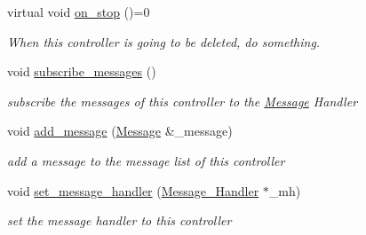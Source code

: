 \begin{DoxyCompactItemize}
virtual void \mbox{\hyperlink{classbanita_1_1_controller_a988fb70a657c61afb82f4f4cf25e7c66}{on\+\_\+stop}} ()=0
\begin{DoxyCompactList}\small\item\em When this controller is going to be deleted, do something. \end{DoxyCompactList}\item 
void \mbox{\hyperlink{classbanita_1_1_controller_a553973436941dd97e75511583a4fff26}{subscribe\+\_\+messages}} ()
\begin{DoxyCompactList}\small\item\em subscribe the messages of this controller to the \mbox{\hyperlink{classbanita_1_1_message}{Message}} Handler \end{DoxyCompactList}\item 
void \mbox{\hyperlink{classbanita_1_1_controller_ade6c8afa9158a302c5c64231deabb7ea}{add\+\_\+message}} (\mbox{\hyperlink{classbanita_1_1_message}{Message}} \&\+\_\+message)
\begin{DoxyCompactList}\small\item\em add a message to the message list of this controller \end{DoxyCompactList}\item 
void \mbox{\hyperlink{classbanita_1_1_controller_a3686102ef847f2f08a1107cfba48f00c}{set\+\_\+message\+\_\+handler}} (\mbox{\hyperlink{classbanita_1_1_message___handler}{Message\+\_\+\+Handler}} $\ast$\+\_\+mh)
\begin{DoxyCompactList}\small\item\em set the message handler to this controller \end{DoxyCompactList}\end{DoxyCompactItemize}
